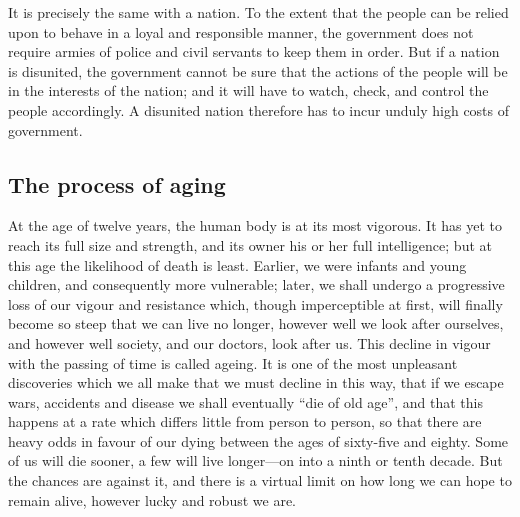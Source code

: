 \documentclass[11pt]{article}
\begin{document}
It is precisely the same with a nation. To the extent that the people can be relied upon to behave in a loyal and responsible manner, the government does not require armies of police and civil servants to keep them in order. But if a nation is disunited, the government cannot be sure that the actions of the people will be in the interests of the nation; and it will have to watch, check, and control the people accordingly. A disunited nation therefore has to incur unduly high costs of government.
\subsection{The process of aging}
\label{sec-2-37}

At the age of twelve years, the human body is at its most vigorous. It has yet to reach its full size and strength, and its owner his or her full intelligence; but at this age the likelihood of death is least. Earlier, we were infants and young children, and consequently more vulnerable; later, we shall undergo a progressive loss of our vigour and resistance which, though imperceptible at first, will finally become so steep that we can live no longer, however well we look after ourselves, and however well society, and our doctors, look after us. This decline in vigour with the passing of time is called ageing. It is one of the most unpleasant discoveries which we all make that we must decline in this way, that if we escape wars, accidents and disease we shall eventually ``die of old age'', and that this happens at a rate which differs little from person to person, so that there are heavy odds in favour of our dying between the ages of sixty-five and eighty. Some of us will die sooner, a few will live longer---on into a ninth or tenth decade. But the chances are against it, and there is a virtual limit on how long we can hope to remain alive, however lucky and robust we are.
\end{document}

